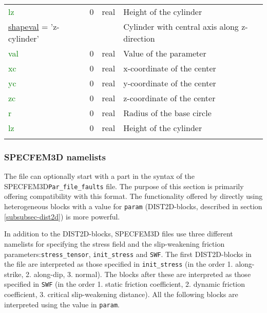 \documentclass[12pt,twoside]{article}
\begin{document}
\begin{longtable}{|p{4.8cm}|p{2cm}|p{2cm}|p{5.4cm}|}
\textcolor{green}{lz} & 0 & real & Height of the cylinder\\
\hdashline
\uline{shapeval} = 'z-cylinder' & & & Cylinder with central axis along z-direction\vspace{0.25cm}\\
\textcolor{green}{val} & 0 & real & Value of the parameter\\
\textcolor{green}{xc} & 0 & real & x-coordinate of the center\\
\textcolor{green}{yc} & 0 & real & y-coordinate of the center\\
\textcolor{green}{zc} & 0 & real & z-coordinate of the center\\
\textcolor{green}{r} & 0 & real & Radius of the base circle\\
\textcolor{green}{lz} & 0 & real & Height of the cylinder\\
\hline
\label{DIST2D-table}
\end{longtable}

\subsubsection{SPECFEM3D namelists} \label{subsubsec-specfem3d}

The file can optionally start with a part in the syntax of the SPECFEM3D\linebreak \texttt{Par\_file\_faults} file. The purpose of this section is primarily offering compatibility with this format. The functionality offered by directly using heterogeneous blocks with a value for \texttt{param} (DIST2D-blocks, described in section \ref{subsubsec-dist2d}) is more powerful.

In addition to the DIST2D-blocks, SPECFEM3D files use three different namelists for specifying the stress field and the slip-weakening friction parameters:\linebreak \texttt{stress\_tensor}, \texttt{init\_stress} and \texttt{SWF}. The first DIST2D-blocks in the file are interpreted as those specified in \texttt{init\_stress} (in the order 1. along-strike, 2. along-dip, 3. normal). The blocks after these are interpreted as those specified in \texttt{SWF} (in the order 1. static friction coefficient, 2. dynamic friction coefficient, 3. critical slip-weakening distance). All the following blocks are interpreted using the value in \texttt{param}.
\end{document}
